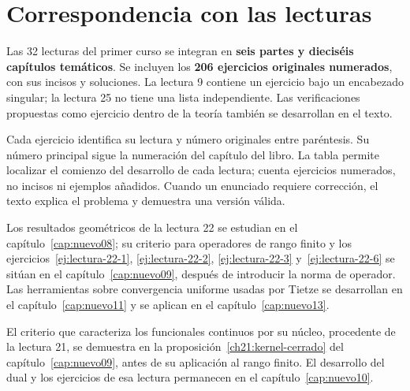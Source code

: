 \chapter{Correspondencia con las lecturas}
Las 32 lecturas del primer curso se integran en \textbf{seis partes y dieciséis capítulos temáticos}. Se incluyen los \textbf{206 ejercicios originales numerados}, con sus incisos y soluciones. La lectura 9 contiene un ejercicio bajo un encabezado singular; la lectura 25 no tiene una lista independiente. Las verificaciones propuestas como ejercicio dentro de la teoría también se desarrollan en el texto.

Cada ejercicio identifica su lectura y número originales entre paréntesis. Su número principal sigue la numeración del capítulo del libro. La tabla permite localizar el comienzo del desarrollo de cada lectura; cuenta ejercicios numerados, no incisos ni ejemplos añadidos. Cuando un enunciado requiere corrección, el texto explica el problema y demuestra una versión válida.

Los resultados geométricos de la lectura 22 se estudian en el capítulo~\ref{cap:nuevo08}; su criterio para operadores de rango finito y los ejercicios~\ref{ej:lectura-22-1}, \ref{ej:lectura-22-2}, \ref{ej:lectura-22-3} y~\ref{ej:lectura-22-6} se sitúan en el capítulo~\ref{cap:nuevo09}, después de introducir la norma de operador. Las herramientas sobre convergencia uniforme usadas por Tietze se desarrollan en el capítulo~\ref{cap:nuevo11} y se aplican en el capítulo~\ref{cap:nuevo13}.

El criterio que caracteriza los funcionales continuos por su núcleo, procedente de la lectura 21, se demuestra en la proposición~\ref{ch21:kernel-cerrado} del capítulo~\ref{cap:nuevo09}, antes de su aplicación al rango finito. El desarrollo del dual y los ejercicios de esa lectura permanecen en el capítulo~\ref{cap:nuevo10}.

